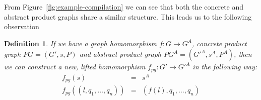 \documentclass{sig-alternate-10pt}
\renewcommand{\path}[2]{ #1 \mapsto \ensuremath{#2} }
\newtheorem{defn}{Definition}
\begin{document}
From Figure~\ref{fig:example-compilation} we can see that both the concrete and abstract product graphs share a similar structure. This leads us to the following observation

\begin{defn}
If we have a graph homomorphism $f : G \rightarrow G^A$, concrete product graph $PG = (G',s,P)$ and abstract product graph $PG^A = (G'^A, s^A, P^A)$, then we can construct a new, lifted homomorphism $f_{pg} : G' \rightarrow G'^A$ in the following way:
\[ \begin{array}{rcl}
  f_{pg}( s ) & = & s^A  \\
  f_{pg}( (l,q_1,\ldots,q_n) ) & = & (f(l),q_1,\ldots,q_n) \\
\end{array} \]
\end{defn}

\newcommand{\state}[4]{\node[state,#3](#1)[#4]{#2};}
\newcommand{\transition}[4]{\path[->] (#1) edge [#4] node {#3} (#2);}
\end{document}
